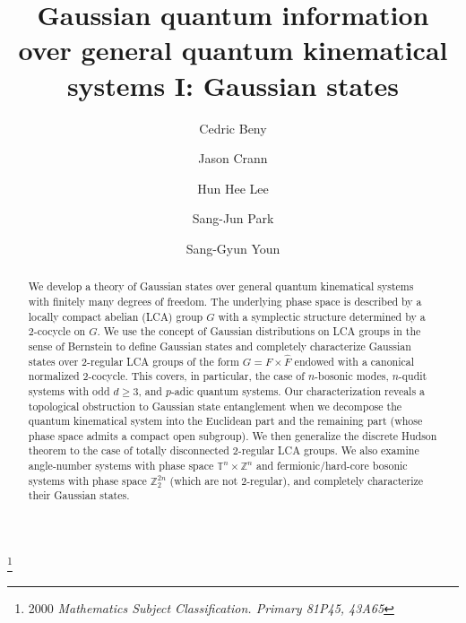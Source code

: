 \documentclass[12pt,reqno]{amsart}
\theoremstyle{definition}
\theoremstyle{definition}
\theoremstyle{definition}
\numberwithin{thm}{section}
\numberwithin{equation}{section}
\newcommand{\tor}{\mathbb{T}}
\newcommand{\z}{\mathbb{Z}}
\begin{document}
\title{Gaussian  quantum information over general quantum kinematical systems I: Gaussian states}




\author{Cedric Beny}
\address{Cedric Beny: Cortex Discovery GmbH}


\author{Jason Crann}
\address{Jason Crann: School of Mathematics \& Statistics, Carleton University, Ottawa, ON, Canada H1S 5B6}


\author{Hun Hee Lee}
\address{Hun Hee Lee: Department of Mathematical Sciences and the Research Institute of Mathematics, Seoul National University, Gwanak-ro 1, Gwanak-gu, Seoul 08826, Republic of Korea}


\author{Sang-Jun Park}
\address{Sang-Jun Park: Department of Mathematical Sciences, Seoul National University, Gwanak-ro 1, Gwanak-gu, Seoul 08826, Republic of Korea}


\author{Sang-Gyun Youn}
\address{Sang-Gyun Youn: Department of Mathematics Education, Seoul National University, Gwanak-ro 1, Gwanak-gu, Seoul 08826, Republic of Korea}
    


\thanks{2000 \it{Mathematics Subject Classification}.
\rm{Primary 81P45, 43A65}}

\begin{abstract} We develop a theory of Gaussian states over general quantum kinematical systems with finitely many degrees of freedom. The underlying phase space is described by a locally compact abelian (LCA) group $G$ with a symplectic structure determined by a 2-cocycle on $G$. We use the concept of Gaussian distributions on LCA groups in the sense of Bernstein to define Gaussian states and completely characterize Gaussian states over 2-regular LCA groups of the form $G= F\times\widehat{F}$ endowed with a canonical normalized 2-cocycle. This covers, in particular, the case of $n$-bosonic modes, $n$-qudit systems with odd $d\ge 3$, and $p$-adic quantum systems. Our characterization reveals a topological obstruction to Gaussian state entanglement when we decompose the quantum kinematical system into the Euclidean part and the remaining part (whose phase space admits a compact open subgroup). We then generalize the discrete Hudson theorem \cite{Gro} to the case of totally disconnected 2-regular LCA groups. We also examine angle-number systems with phase space $\tor^n\times\z^n$ and fermionic/hard-core bosonic systems with phase space $\z^{2n}_2$ (which are not 2-regular), and completely characterize their Gaussian states.

\end{abstract}
\end{document}
